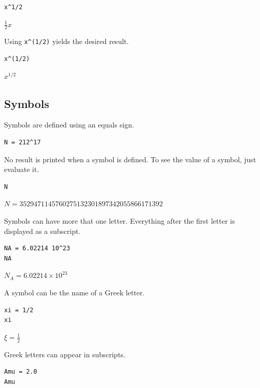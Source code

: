 \documentclass[12pt]{article}
\begin{document}
{\color{blue}
\begin{verbatim}
x^1/2
\end{verbatim}
}

$\displaystyle \tfrac{1}{2}x$

\bigskip

Using \verb$x^(1/2)$ yields the desired result.

{\color{blue}
\begin{verbatim}
x^(1/2)
\end{verbatim}
}

$\displaystyle x^{1/2}$

\subsection{Symbols}

Symbols are defined using an equals sign.

{\color{blue}
\begin{verbatim}
N = 212^17
\end{verbatim}
}

No result is printed when a symbol is defined.
To see the value of a symbol, just evaluate it.

{\color{blue}
\begin{verbatim}
N
\end{verbatim}
}

$\displaystyle N=3529471145760275132301897342055866171392$

\bigskip

Symbols can have more that one letter.
Everything after the first letter is displayed as a subscript.

{\color{blue}
\begin{verbatim}
NA = 6.02214 10^23
NA
\end{verbatim}
}

$\displaystyle N_A=6.02214\times10^{23}$

\bigskip

A symbol can be the name of a Greek letter.

{\color{blue}
\begin{verbatim}
xi = 1/2
xi
\end{verbatim}
}

$\displaystyle \xi=\tfrac{1}{2}$

\bigskip

Greek letters can appear in subscripts.

{\color{blue}
\begin{verbatim}
Amu = 2.0
Amu
\end{verbatim}
}
\end{document}
